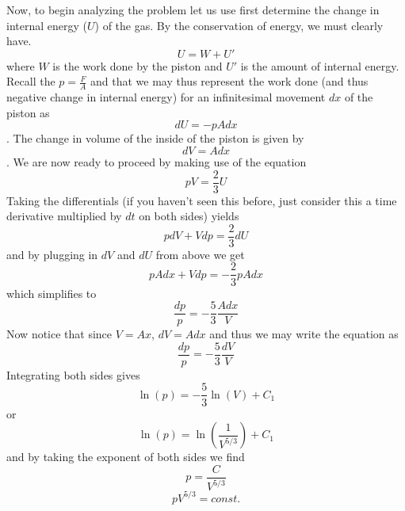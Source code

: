 \documentclass[12pt,letterpaper]{article}
\begin{document}
Now, to begin analyzing the problem let us use first determine the change in internal energy ($U$) of the gas. By the conservation of energy, we must clearly have.
\[ U = W + U' \]
where $W$ is the work done by the piston and $U'$ is the amount of internal energy. Recall the $p=\frac{F}{A}$ and that we may thus represent the work done (and thus  negative change in internal energy) for an infinitesimal movement $dx$ of the piston as 
\[ dU=-pAdx \].
The change in volume of the inside of the piston is given by 
\[ dV=Adx \].
We are now ready to proceed by making use of the equation 
\[ pV = \frac{2}{3}U \]
Taking the differentials (if you haven't seen this before, just consider this a time derivative multiplied by $dt$ on both sides) yields
\[ pdV + Vdp = \frac{2}{3} dU \]
and by plugging in $dV$ and $dU$ from above we get
\[ pAdx + Vdp = -\frac{2}{3} pAdx \]
which simplifies to
\[ \frac{dp}{p} = -\frac{5}{3}\frac{Adx}{V} \]
Now notice that since $V=Ax$, $dV=Adx$ and thus we may write the equation as 
\[ \frac{dp}{p} = -\frac{5}{3}\frac{dV}{V} \]
Integrating both sides gives 
\[ \ln(p) = -\frac{5}{3}\ln(V) + C_1 \]
or
\[ \ln(p) = \ln\left(\frac{1}{V^{5/3}}\right)+C_1 \]
and by taking the exponent of both sides we find
\[ p = \frac{C}{V^{5/3}} \]
\[ pV^{5/3} = const. \]
\end{document}
